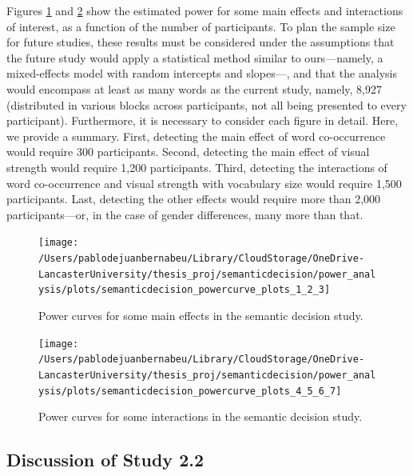 \documentclass[
  12pt,
  man,floatsintext]{apa7}
\begin{document}
Figures \ref{fig:semanticdecision-powercurve-plots-1-2-3} and \ref{fig:semanticdecision-powercurve-plots-4-5-6-7} show the estimated power for some main effects and interactions of interest, as a function of the number of participants. To plan the sample size for future studies, these results must be considered under the assumptions that the future study would apply a statistical method similar to ours---namely, a mixed-effects model with random intercepts and slopes---, and that the analysis would encompass at least as many words as the current study, namely, 8,927 (distributed in various blocks across participants, not all being presented to every participant). Furthermore, it is necessary to consider each figure in detail. Here, we provide a summary. First, detecting the main effect of word co-occurrence would require 300 participants. Second, detecting the main effect of visual strength would require 1,200 participants. Third, detecting the interactions of word co-occurrence and visual strength with vocabulary size would require 1,500 participants. Last, detecting the other effects would require more than 2,000 participants---or, in the case of gender differences, many more than that.

\begin{figure}

{\centering \texttt{[image: /Users/pablodejuanbernabeu/Library/CloudStorage/OneDrive-LancasterUniversity/thesis\_proj/semanticdecision/power\_analysis/plots/semanticdecision\_powercurve\_plots\_1\_2\_3]} 

}

\caption{Power curves for some main effects in the semantic decision study.}\label{fig:semanticdecision-powercurve-plots-1-2-3}
\end{figure}

\begin{figure}

{\centering \texttt{[image: /Users/pablodejuanbernabeu/Library/CloudStorage/OneDrive-LancasterUniversity/thesis\_proj/semanticdecision/power\_analysis/plots/semanticdecision\_powercurve\_plots\_4\_5\_6\_7]} 

}

\caption{Power curves for some interactions in the semantic decision study.}\label{fig:semanticdecision-powercurve-plots-4-5-6-7}
\end{figure}

\hypertarget{discussion-of-study-2.2}{%
\subsection{Discussion of Study 2.2}\label{discussion-of-study-2.2}}
\end{document}
